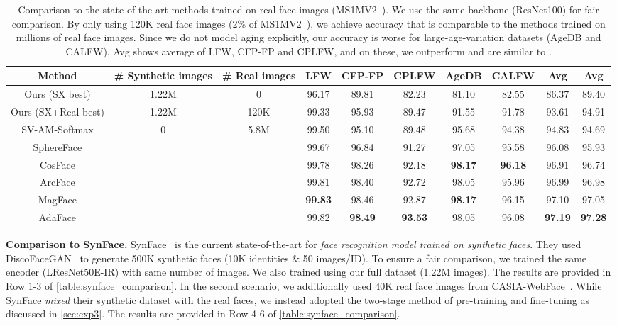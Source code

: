 \documentclass[10pt,twocolumn,letterpaper]{article}
\begin{document}
\begin{table*}[t]
\footnotesize
\setlength{\tabcolsep}{2.9pt}
\begin{center}
\begin{tabular}{c|c|c|ccccc|cc}
\toprule
Method & \# Synthetic images & \# Real images
& LFW & CFP-FP & CPLFW & AgeDB & CALFW & Avg & Avg \\
\midrule
Ours (SX best) & 1.22M & 0 
& 96.17 & 89.81 & 82.23 & 81.10 & 82.55 & 86.37 & 89.40
\\
Ours (SX+Real best) & 1.22M & 120K
& 99.33 & 95.93 & 89.47 & 91.55 & 91.78 & 93.61 & 94.91
\\
\hline
SV-AM-Softmax \cite{2018_FR_SV-AM-Softmax} & \multirow{6}{*}{0} & \multirow{6}{*}{5.8M}
& 99.50 & 95.10 & 89.48 & 95.68 & 94.38 & 94.83 & 94.69
\\
SphereFace \cite{2017_FR_SphereFace} &   & 
& 99.67 & 96.84 & 91.27 & 97.05 & 95.58 & 96.08 & 95.93
\\
CosFace \cite{2018_FR_CosFace} & & 
& 99.78 & 98.26 & 92.18 & \textbf{98.17} & \textbf{96.18} & 96.91 & 96.74 \\
ArcFace \cite{2019_FR_ArcFace} & &
& 99.81 & 98.40 & 92.72 & 98.05 & 95.96 & 96.99 & 96.98 \\
MagFace \cite{2021_FR_magface} & &
& \textbf{99.83} & 98.46 & 92.87 & \textbf{98.17} & 96.15 & 97.10 & 97.05 \\
AdaFace \cite{2022_FR_adaface} & &
& 99.82 & \textbf{98.49} & \textbf{93.53} & 98.05 & 96.08 & \textbf{97.19} & \textbf{97.28}
\\
\bottomrule
\end{tabular}
\end{center}
\caption{Comparison to the state-of-the-art methods trained on real face images (MS1MV2~\cite{2019_FR_ArcFace}). We use the same backbone (ResNet100) for fair comparison. By only using 120K real face images (2\% of MS1MV2~\cite{2019_FR_ArcFace}), we achieve accuracy that is comparable to the methods trained on millions of real face images. Since we do not model aging explicitly, our accuracy is worse for large-age-variation datasets (AgeDB and CALFW). Avg shows average of LFW, CFP-FP and CPLFW, and on these, we outperform \cite{2018_FR_SV-AM-Softmax} and are similar to \cite{2017_FR_SphereFace}.
}
\label{table:sota_comparison}
\end{table*}

\noindent
\textbf{Comparison to SynFace.} 
SynFace~\cite{2021_FR_synface} is the current state-of-the-art for \textit{face recognition model trained on synthetic faces}. 
They used DiscoFaceGAN~\cite{2020_discofacegan} to generate 500K synthetic faces (10K identities \& 50 images/ID). 
To ensure a fair comparison, we trained the same encoder (LResNet50E-IR) with same number of images.
We also trained using our full dataset (1.22M images). 
The results are provided in Row 1-3 of \autoref{table:synface_comparison}. 
In the second scenario, we additionally used 40K real face images from CASIA-WebFace~\cite{2014_FRD_casiawebface}. 
While SynFace \textit{mixed} their synthetic dataset with the real faces, we instead adopted the two-stage method of pre-training and fine-tuning as discussed in \autoref{sec:exp3}.
The results are provided in Row 4-6 of \autoref{table:synface_comparison}.
\end{document}
